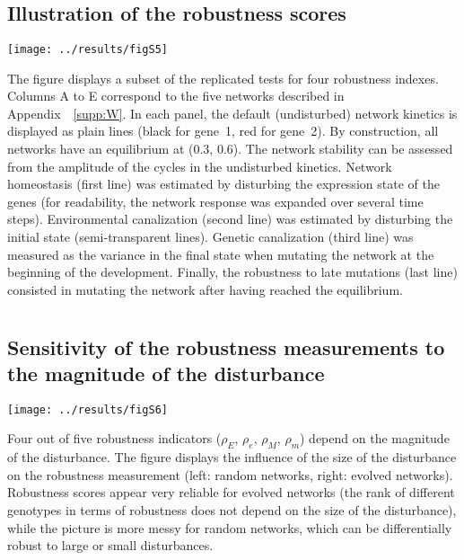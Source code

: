 \documentclass[10pt,a4paper]{article}
\newcommand{\earlyenv}{{\rho_E}}
\newcommand{\lateenv}{{\rho_e}}
\newcommand{\earlymut}{{\rho_M}}
\newcommand{\latemut}{{\rho_m}}
\newcommand{\SupMat}{Appendix~}
\begin{document}
\begin{appendices}
  \clearpage


  \clearpage
  \section{}
    \label{supp:simpanels}
    \subsection*{Illustration of the robustness scores}

	\begin{adjustwidth}{-1in}{0in}
	\begin{flushright}
	\texttt{[image: ../results/figS5]}
	\end{flushright}
	\color{Gray} The figure displays a subset of the replicated tests for four robustness indexes. Columns A to E correspond to the five networks described in \SupMat~\ref{supp:W}. In each panel, the default (undisturbed) network kinetics is displayed as plain lines (black for gene~1, red for gene~2). By construction, all networks have an equilibrium at (0.3, 0.6). The network stability can be assessed from the amplitude of the cycles in the undisturbed kinetics. Network homeostasis (first line) was estimated by disturbing the expression state of the genes (for readability, the network response was expanded over several time steps). Environmental canalization (second line) was estimated by disturbing the initial state (semi-transparent lines). Genetic canalization (third line) was measured as the variance in the final state when mutating the network at the beginning of the development. Finally, the robustness to late mutations (last line) consisted in mutating the network after having reached the equilibrium.
	\end{adjustwidth}

  \clearpage
  \section{}
    \label{supp:sensitmag}
    \subsection*{Sensitivity of the robustness measurements to the magnitude of the disturbance}
	\begin{center}
	\texttt{[image: ../results/figS6]}
	\end{center}
	{\color{Gray} Four out of five robustness indicators ($\earlyenv$, $\lateenv$, $\earlymut$, $\latemut$) depend on the magnitude of the disturbance. The figure displays the influence of the size of the disturbance on the robustness measurement (left: random networks, right: evolved networks). Robustness scores appear very reliable for evolved networks (the rank of different genotypes in terms of robustness does not depend on the size of the disturbance), while the picture is more messy for random networks, which can be differentially robust to large or small disturbances. }



\end{appendices}
\end{document}
